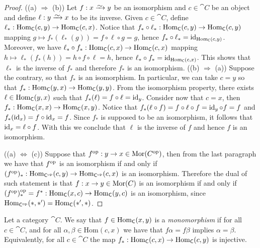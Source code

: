\begin{proof}
  ((a) \(\Rightarrow\) (b)) Let \(f: x \isoto y\) be an isomorphism and \(c
  \in \cat C\) be an object and define \(\ell : y \isoto x\) to be its inverse.
  Given \(c \in \cat C\), define \(\ell_*: \operatorname{Hom}_{\mathsf C}(c, y) \to \operatorname{Hom}_{\mathsf
  C}(c, x)\). Notice that \(f_* \circ \ell_* : \operatorname{Hom}_{\mathsf C}(c, y) \to
  \operatorname{Hom}_{\mathsf C}(c, y)\) mapping \(g \mapsto f_*(\ell_*(g)) = f \circ \ell \circ
  g = g\), hence \(f_* \circ \ell_* = \operatorname{id}_{\operatorname{Hom}_{\mathsf C}(c, y)}\). Moreover, we
  have \(\ell_* \circ f_* : \operatorname{Hom}_{\mathsf C}(c, x) \to \operatorname{Hom}_{\mathsf C}(c, x)\)
  mapping \(h \mapsto \ell_*(f_*(h)) = h \circ f \circ \ell = h\), hence
  \(\ell_* \circ f_* = \operatorname{id}_{\operatorname{Hom}_{\mathsf C}(c, x)}\). This shows that \(\ell_*\) 
  is the inverse of \(f_*\) and therefore \(f_*\) is an isomorphism. ((b)
  \(\Rightarrow\) (a)) Suppose the contrary, so that \(f_*\) is an isomorphism.
  In particular, we can take \(c = y\) so that \(f_*: \operatorname{Hom}_{\mathsf C}(y, x) \to
  \operatorname{Hom}_{\mathsf C}(y, y)\). From the isomorphism property, there exists \(\ell \in
  \operatorname{Hom}_{\mathsf C}(y, x)\) such that \(f_*(\ell) = f \circ \ell = \operatorname{id}_y\). Consider
  now that \(c = x\), then \(f_*: \operatorname{Hom}_{\mathsf C}(x, x) \to \operatorname{Hom}_{\mathsf C}(x, y)\).
  Notice that \(f_*(\ell \circ f) = f \circ \ell \circ f = \operatorname{id}_y \circ f = f\)
  and \(f_*(\operatorname{id}_x) = f \circ \operatorname{id}_x = f\). Since \(f_*\) is supposed to be an
  isomorphism, it follows that \(\operatorname{id}_x = \ell \circ f\). With this we conclude
  that \(\ell\) is the inverse of \(f\) and hence \(f\) is an isomorphism. 

  ((a) \(\Leftrightarrow\) (c)) Suppose that \(f^{\mathrm{op}}: y \to x \in \mathsf
  {\operatorname{Mor}}(C^{\mathrm{op}})\), then from the last paragraph we have that \(f^{\mathrm{op}}\) is an
  isomorphism if and only if \((f^{\mathrm{op}})_* : \operatorname{Hom}_{\mathsf C^{\mathrm{op}}}(c, y) \to
  \operatorname{Hom}_{\mathsf C^{\mathrm{op}}}(c, x)\) is an isomorphism. Therefore the dual of such
  statement is that \(f: x \to y \in \mathsf {\operatorname{Mor}}(C)\) is an isomorphism if and
  only if \((f^{\mathrm{op}})_*^{\mathrm{op}} = f^*: \operatorname{Hom}_{\mathsf C}(x, c) \to \operatorname{Hom}_{\mathsf C}(y, c)\)
  is an isomorphism, since \(\operatorname{Hom}_{\mathsf C^{\mathrm{op}}}(*, *') = \operatorname{Hom}_{\mathsf C}(*', *)\).
\end{proof}

\begin{definition}[Monomorphism]\label{def: monomorphism}
  Let a category \(\cat{C}\). We say that \(f \in \operatorname{Hom}_{\mathsf C}(x, y)\) is a
  \emph{monomorphism} if for all \(c \in \cat{C}\), and for all \(\alpha, \beta
  \in \mathrm{Hom}(c, x)\) we have that \(f \alpha = f \beta\) implies \(\alpha
  = \beta\). Equivalently, for all \(c \in \cat C\) the map \(f_*: \operatorname{Hom}_{\mathsf
  C}(c, x) \to \operatorname{Hom}_{\mathsf C}(c, y)\) is injective.
\end{definition}

